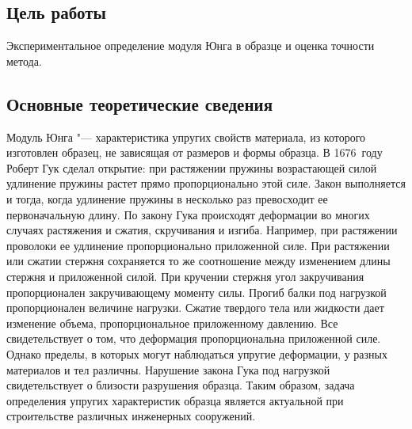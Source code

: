 \documentclass[a4paper, 12pt]{extarticle}
\begin{document}
\MTDTitlePage
\MTDInfoPage

\setcounter{section}{9}

\subsection{Цель работы}
Экспериментальное определение модуля Юнга в образце и оценка точности метода. 

\subsection{Основные теоретические сведения}
Модуль Юнга "--- характеристика упругих свойств материала, из которого изготовлен образец, не зависящая от размеров и формы образца. В 1676~году Роберт Гук сделал открытие: при растяжении пружины возрастающей силой удлинение пружины растет прямо пропорционально этой силе. Закон выполняется и тогда, когда удлинение пружины в несколько раз превосходит ее первоначальную длину. По закону Гука происходят деформации во многих случаях растяжения и сжатия, скручивания и изгиба. Например, при растяжении проволоки ее удлинение пропорционально приложенной силе. При растяжении или сжатии стержня сохраняется то же соотношение между изменением длины стержня и приложенной силой. При кручении стержня угол закручивания пропорционален закручивающему моменту силы. Прогиб балки под нагрузкой пропорционален величине нагрузки. Сжатие твердого тела или жидкости дает изменение объема, пропорциональное приложенному давлению. Все свидетельствует о том, что деформация пропорциональна приложенной силе. Однако пределы, в которых могут наблюдаться упругие деформации, у разных материалов и тел различны. Нарушение закона Гука под нагрузкой свидетельствует о близости разрушения образца. Таким образом, задача определения упругих характеристик образца является актуальной при строительстве различных инженерных сооружений.
\end{document}
